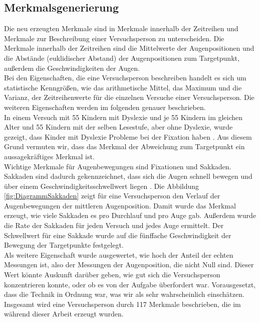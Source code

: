 \documentclass[12pt]{article}
\begin{document}
\subsection*{Merkmalsgenerierung}
Die neu erzeugten Merkmale sind in Merkmale innerhalb der Zeitreihen und Merkmale zur Beschreibung einer Versuchsperson zu unterscheiden. Die Merkmale innerhalb der Zeitreihen sind die Mittelwerte der Augenpositionen und die Abst\"ande (euklidischer Abstand) der Augenpositionen zum Targetpunkt, au\ss{}erdem die Geschwindigkeiten der Augen.\\
Bei den Eigenschaften, die eine Versuchsperson beschreiben handelt es sich um statistische Kenngr\"o\ss{}en, wie das arithmetische Mittel, das Maximum und die Varianz, der Zeitreihenwerte f\"ur die einzelnen Versuche einer Versuchsperson. Die weiteren Eigenschaften werden im folgenden genauer beschrieben.\\
In einem Versuch mit 55 Kindern mit Dyslexie und je 55 Kindern im gleichen Alter und 55 Kindern mit der selben Lesestufe, aber ohne Dyslexie, wurde gezeigt, dass Kinder mit Dyslexie Probleme bei der Fixation haben \cite{Tiadi2016}. Aus diesem Grund vermuten wir, dass das Merkmal der Abweichung zum Targetpunkt ein aussagekr\"aftiges Merkmal ist.\\
Wichtige Merkmale f\"ur Augenbewegungen sind Fixationen und Sakkaden. Sakkaden sind dadurch gekennzeichnet, dass sich die Augen schnell bewegen und \"uber einem Geschwindigkeits\-schwellwert liegen \cite[p.~152]{EyeTracking}. Die Abbildung \ref{fig:DiagrammSakkaden} zeigt f\"ur eine Versuchsperson den Verlauf der Augenbewegungen der mittleren Augenposition. Damit wurde das Merkmal erzeugt, wie viele Sakkaden es pro Durchlauf und pro Auge gab. Au\ss{}erdem wurde die Rate der Sakkaden f\"ur jeden Versuch und jedes Auge ermittelt. Der Schwellwert f\"ur eine Sakkade wurde auf die f\"unffache Geschwindigkeit der Bewegung der Targetpunkte festgelegt.\\
Als weitere Eigenschaft wurde ausgewertet, wie hoch der Anteil der echten Messungen ist, also der Messungen der Augenposition, die nicht Null sind. Dieser Wert k\"onnte Auskunft dar\"uber geben, wie gut sich die Versuchsperson konzentrieren konnte, oder ob es von der Aufgabe \"uberfordert war. Vorausgesetzt, dass die Technik in Ordnung war, was wir als sehr wahrscheinlich einsch\"atzen.\\
Insgesamt wird eine Versuchsperson durch 117 Merkmale beschrieben, die im w\"ahrend dieser Arbeit erzeugt wurden.
\end{document}

